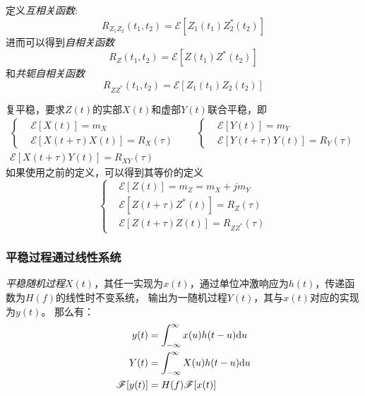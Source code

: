     定义\emph{互相关函数}:
    \begin{equation}
        R_{Z_1Z_2}(t_1,t_2)=\mathscr{E}[Z_1(t_1)Z^*_2(t_2)]
    \end{equation}
    进而可以得到\emph{自相关函数}
    \begin{equation}
        R_{Z}(t_1,t_2)=\mathscr{E}[Z(t_1)Z^*(t_2)]
    \end{equation}
    和\emph{共轭自相关函数}
    \begin{equation}
        R_{ZZ^*}(t_1,t_2)=\mathscr{E}[Z_1(t_1)Z_2(t_2)]
    \end{equation}

    复平稳，要求$Z(t)$的实部$X(t)$和虚部$Y(t)$联合平稳，即
    \begin{equation}
        \begin{split}
            \left\{\begin{aligned}
                &\mathscr{E}[X(t)]=m_X\\
                &\mathscr{E}[X(t+\tau)X(t)]=R_X(\tau)
            \end{aligned}\right.
            \hspace{2em}
            \left\{\begin{aligned}
                &\mathscr{E}[Y(t)]=m_Y\\
                &\mathscr{E}[Y(t+\tau)Y(t)]=R_Y(\tau)
            \end{aligned}\right.\\
            \mathscr{E}[X(t+\tau)Y(t)]=R_{XY}(\tau)\hspace{5em}
        \end{split}
    \end{equation}
    如果使用之前的定义，可以得到其等价的定义
    \begin{equation}
        \left\{\begin{aligned}
            &\mathscr{E}[Z(t)]=m_Z=m_X+jm_Y\\
            &\mathscr{E}[Z(t+\tau)Z^*(t)]=R_Z(\tau)\\
            &\mathscr{E}[Z(t+\tau)Z(t)]=R_{ZZ^*}(\tau)
        \end{aligned}\right.
    \end{equation}

    \subsubsection{平稳过程通过线性系统}
    \emph{平稳随机过程}$X(t)$，其任一实现为$x(t)$，通过单位冲激响应为$h(t)$，传递函数为$H(f)$的线性时不变系统，
    输出为一随机过程$Y(t)$，其与$x(t)$对应的实现为$y(t)$。
    那么有：
    \begin{align}
        y(t)&=\int_{-\infty}^{\infty}x(u)h(t-u)\text{\upshape d} u\\
        Y(t)&=\int_{-\infty}^{\infty}X(u)h(t-u)\text{\upshape d} u \label{eq:stochastic_conv}\\
        \mathscr{F}[y(t)]&=H(f)\mathscr{F}[x(t)]
    \end{align}

